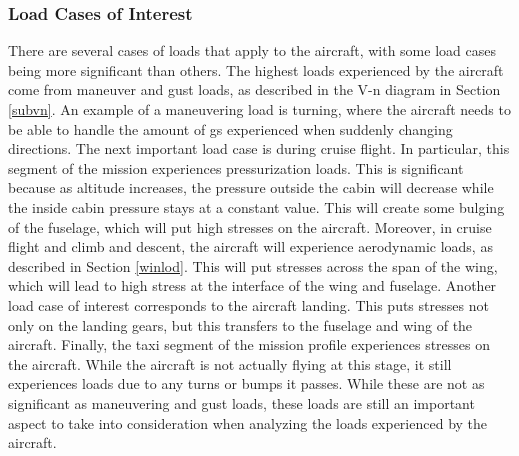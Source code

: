 \subsubsection{Load Cases of Interest}
\label{lcoi}
There are several cases of loads that apply to the aircraft, with some load cases being more significant than others. The highest loads experienced by the aircraft come from maneuver and gust loads, as described in the V-n diagram in Section \ref{subvn}. An example of a maneuvering load is turning, where the aircraft needs to be able to handle the amount of gs experienced when suddenly changing directions. The next important load case is during cruise flight. In particular, this segment of the mission experiences pressurization loads. This is significant because as altitude increases, the pressure outside the cabin will decrease while the inside cabin pressure stays at a constant value. This will create some bulging of the fuselage, which will put high stresses on the aircraft. Moreover, in cruise flight and climb and descent, the aircraft will experience aerodynamic loads, as described in Section \ref{winlod}. This will put stresses across the span of the wing, which will lead to high stress at the interface of the wing and fuselage. Another load case of interest corresponds to the aircraft landing. This puts stresses not only on the landing gears, but this transfers to the fuselage and wing of the aircraft. Finally, the taxi segment of the mission profile experiences stresses on the aircraft. While the aircraft is not actually flying at this stage, it still experiences loads due to any turns or bumps it passes. While these are not as significant as maneuvering and gust loads, these loads are still an important aspect to take into consideration when analyzing the loads experienced by the aircraft.



